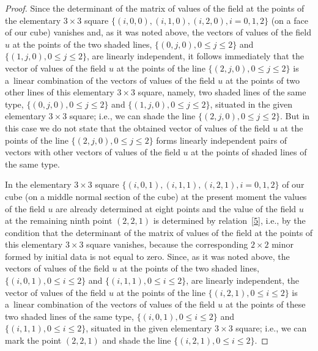 \begin{proof}
Since the determinant of the matrix of values of the f\/ield at the
points of the elementary $3 \times 3$ square $\{(i, 0, 0), (i, 1,
0), (i, 2, 0), i = 0, 1, 2\}$ (on a face of our cube) vanishes and,
as it was noted above, the vectors of values of the f\/ield $u$ at the
points of the two shaded lines, $\{(0, j, 0), 0 \leq j \leq 2\}$ and
$\{(1, j, 0), 0 \leq j \leq 2\}$, are linearly independent, it
follows immediately that the vector of values of the f\/ield $u$ at
the points of the line $\{(2, j, 0), 0 \leq j \leq 2\}$ is a~linear
combination of the vectors of values of the f\/ield $u$ at the points
of two other lines of this elementary $3 \times 3$ square, namely,
two shaded lines of the same type, $\{(0, j, 0), 0 \leq j \leq 2\}$
and $\{(1, j, 0), 0 \leq j \leq 2\}$, situated in the given
elementary $3 \times 3$ square; i.e., we can shade the line $\{(2,
j, 0), 0 \leq j \leq 2\}$. But in this case we do not state that the
obtained vector of values of the f\/ield $u$ at the points of the line
$\{(2, j, 0), 0 \leq j \leq 2\}$ forms linearly independent pairs of
vectors with other vectors of values of the f\/ield $u$ at the points
of shaded lines of the same type.


In the elementary $3 \times 3$ square $\{(i, 0, 1), (i, 1, 1), (i,
2, 1), i = 0, 1, 2\}$ of our cube (on a middle normal section of the
cube) at the present moment the values of the f\/ield $u$ are already
determined at eight points and the value of the f\/ield $u$ at the
remaining ninth point $(2, 2, 1)$ is determined by relation~\eqref{5},
i.e., by the condition that the determinant of the
matrix of values of the f\/ield at the points of this elementary $3
\times 3$ square vanishes, because the corresponding $2 \times 2$
minor formed by initial data is not equal to zero. Since, as it was
noted above, the vectors of values of the f\/ield $u$ at the points of
the two shaded lines, $\{(i, 0, 1), 0 \leq i \leq 2\}$ and $\{(i, 1,
1), 0 \leq i \leq 2\}$, are linearly independent, the vector of
values of the f\/ield $u$ at the points of the line $\{(i, 2, 1), 0
\leq i \leq 2\}$ is a~linear combination of the vectors of values of
the f\/ield $u$ at the points of these two shaded lines of the same
type, $\{(i, 0, 1), 0 \leq i \leq 2\}$ and $\{(i, 1, 1), 0 \leq i
\leq 2\}$, situated in the given elementary $3 \times 3$ square;
i.e., we can mark the point $(2, 2, 1)$ and shade the line $\{(i, 2,
1), 0 \leq i \leq 2\}$.





\end{proof}
